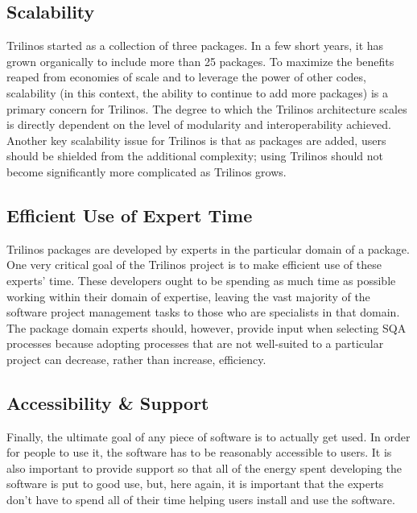 \documentclass[12pt,relax]{article}
\begin{document}
\subsection{Scalability}
Trilinos started as a collection of three packages.  In a few short years, it
has grown organically to include more than 25 packages.  To maximize the
benefits reaped from economies of scale and to leverage the power of other
codes, scalability (in this context, the ability to continue to add more
packages) is a primary concern for Trilinos.  The degree to which the Trilinos
architecture scales is directly dependent on the level of modularity and
interoperability achieved.  Another key scalability issue for Trilinos is that
as packages are added, users should be shielded from the additional complexity;
using Trilinos should not become significantly more complicated as Trilinos
grows.

\subsection{Efficient Use of Expert Time}
Trilinos packages are developed by experts in the particular domain of a
package.  One very critical goal of the Trilinos project is to make efficient
use of these experts' time.  These developers ought to be spending as much 
time as possible working within their domain of expertise, leaving the vast
majority of the software project management tasks to those who are specialists
in that domain.  The package domain experts should, however, provide input when
selecting SQA processes because adopting processes that are not well-suited to
a particular project can decrease, rather than increase, efficiency.

\subsection{Accessibility \& Support}
Finally, the ultimate goal of any piece of software is to actually get used.  
In order for people to use it, the software has to be reasonably accessible to
users.  It is also important to provide support so that all of the energy spent
developing the software is put to good use, but, here again, it is important
that the experts don't have to spend all of their time helping users install
and use the software.

\clearpage

\end{document}
